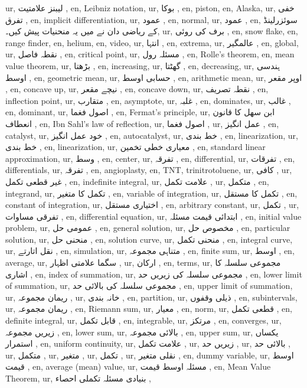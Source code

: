 ur, لیبنز علامتیت  ,
en, Leibniz notation,
ur, بوکا ,
en, piston,
en, Alaska,
ur, خفی تفرق ,
en, implicit differentiation,
ur, عمود ,
en, normal,
ur, عمود ,
en, سوئزرلینڈ کے ریاضی دان نے  میں یہ منحنیات پیش کیں۔,
ur, برف کی روئی ,
en, snow flake,
en, range finder,
en, helium,
en, video,
ur, انتہا ,
en, extrema,
ur, عالمگیر ,
en, global,
ur, نقطہ فاصل ,
en, critical point,
ur, مسئلہ رول ,
en, Rolle's theorem,
en, mean value theorem,
ur, بڑھتا ,
en, increasing,
ur, گھٹتا ,
en, decreasing,
ur, ہندسی اوسط ,
en, geometric mean,
ur, حسابی اوسط ,
en, arithmetic mean,
ur, اوپر مقعر ,
en, concave up,
ur, نیچے مقعر ,
en, concave down,
ur, نقطہ تصریف ,
en, inflection point,
ur, متقارب ,
en, asymptote,
ur, غلبہ ,
en, dominates,
ur, غالب ,
en, dominant,
ur, اصول فغما ,
en, Fermat's principle,
ur, ابن سھل کا قانون انعطاف ,
en, Ibn Sahl's law of reflection,
ur, اصول فغما ,
ur, عمل انگیز ,
en, catalyst,
ur, خود عمل انگیز ,
en, autocatalyst,
ur, خط بندی ,
en, linearization,
ur, خط بندی ,
en, linearization,
ur, معیاری خطی تخمین ,
en, standard linear approximation,
ur, وسط ,
en, center,
ur, تفرقہ ,
en, differential,
ur, تفرقات  ,
en, differentials,
ur, تفرقہ ,
en, angioplasty,
en, TNT, trinitrotoluene,
ur, کافی ,
ur, غیر قطعی تکمل ,
en, indefinite integral,
ur, علامت تکمل ,
ur, متکمل ,
en, integrand,
ur, تکمل کا متغیر ,
en, variable of integration,
ur, تکمل کا مستقل ,
en, constant of integration,
ur, اختیاری مستقل ,
en, arbitrary constant,
ur, تکمل ,
ur, تفرقی مساوات ,
en, differential equation,
ur, ابتدائی قیمت مسئلہ ,
en, initial value problem,
ur, عمومی حل ,
en, general solution,
ur, مخصوص حل ,
en, particular solution,
ur, منحنی حل ,
en, solution curve,
ur, منحنی تکمل ,
en, integral curve,
ur, نقل اتارتے ,
en, simulation,
ur, متناہی مجموعہ ,
en, finite sum,
ur, اوسط ,
en, average,
ur, سگما علامتی اظہار ,
ur, ارکان ,
en, terms,
ur, مجموعی سلسلہ کا اشاری ,
en, index of summation,
ur, مجموعی سلسلہ کی زیریں حد ,
en, lower limit of summation,
ur, مجموعی سلسلہ کی بالائی حد ,
en, upper limit of summation,
ur, ریمان مجموعہ ,
ur, خانہ بندی ,
en, partition,
ur, ذیلی وقفوں ,
en, subintervals,
ur, ریمان مجموعہ ,
en, Riemann sum,
ur, معیار ,
en, norm,
ur, قطعی تکمل ,
en, definite integral,
ur, قابل تکمل ,
en, integrable,
ur, مرتکز ,
en, converges,
ur, زیریں مجموعہ ,
en, lower sum,
ur, بالائی مجموعہ  ,
en, upper sum,
ur, یکساں استمرار ,
en, uniform continuity,
ur, علامت تکمل ,
ur, زیریں حد ,
ur, بالائی حد ,
ur, متکمل ,
ur, متغیر ,
ur, تکمل ,
ur, نقلی متغیر ,
en, dummy variable,
ur, اوسط قیمت ,
en, average (mean) value,
ur, مسئلہ اوسط قیمت  ,
en, Mean Value Theorem,
ur, بنیادی مسئلہ تکملی احصاء ,
